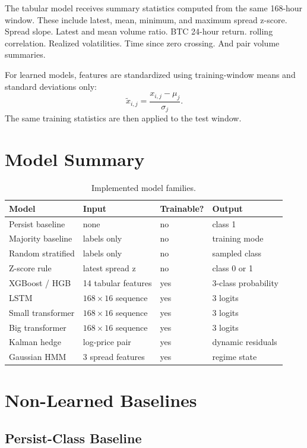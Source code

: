 \documentclass[11pt]{article}
\begin{document}
The tabular model receives summary statistics computed from the same
168-hour window. These include latest, mean, minimum, and maximum spread
z-score. Spread slope. Latest and mean volume ratio. BTC 24-hour return.
rolling correlation. Realized volatilities. Time since zero crossing. And pair
volume summaries.

For learned models, features are standardized using training-window means and
standard deviations only:
\[
\tilde{x}_{i,j} = \frac{x_{i,j} - \mu_j}{\sigma_j}.
\]
The same training statistics are then applied to the test window.

\section{Model Summary}

\begin{table}[h]
\centering
\caption{Implemented model families.}
\begin{tabular}{llll}
\toprule
Model & Input & Trainable? & Output \\
\midrule
Persist baseline & none & no & class 1 \\
Majority baseline & labels only & no & training mode \\
Random stratified & labels only & no & sampled class \\
Z-score rule & latest spread z & no & class 0 or 1 \\
XGBoost / HGB & 14 tabular features & yes & 3-class probability \\
LSTM & \(168 \times 16\) sequence & yes & 3 logits \\
Small transformer & \(168 \times 16\) sequence & yes & 3 logits \\
Big transformer & \(168 \times 16\) sequence & yes & 3 logits \\
Kalman hedge & log-price pair & yes & dynamic residuals \\
Gaussian HMM & 3 spread features & yes & regime state \\
\bottomrule
\end{tabular}
\end{table}

\section{Non-Learned Baselines}

\subsection{Persist-Class Baseline}
\end{document}
